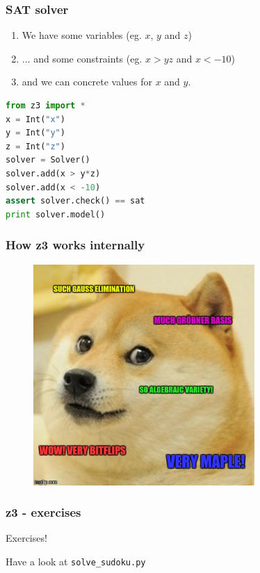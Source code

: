 \documentclass{beamer}
\begin{document}
\begin{frame}[fragile]
    \frametitle{SAT solver}

    \begin{enumerate}
        \pause \item We have some variables (eg. $x$, $y$ and $z$)
        \pause \item ... and some constraints (eg. $x > y z$ and $x < -10$)
        \pause \item and we can concrete values for $x$ and $y$.
    \end{enumerate}

    \pause
    \begin{lstlisting}[language=python]
from z3 import *
x = Int("x")
y = Int("y")
z = Int("z")
solver = Solver()
solver.add(x > y*z)
solver.add(x < -10)
assert solver.check() == sat
print solver.model()
    \end{lstlisting}

    \pause
\end{frame}


\begin{frame}
    \frametitle{How z3 works internally}
    \pause 
    \begin{figure}[h]
        \includegraphics[width=0.75\textwidth]{z3doge}
    \end{figure}
\end{frame}


\begin{frame}
    \frametitle{z3 - exercises}
    \begin{center}
        {\Huge Exercises!}
    \end{center}
    Have a look at \texttt{solve\_sudoku.py}
\end{frame}
\end{document}

